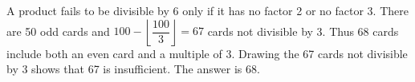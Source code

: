 A product fails to be divisible by 6 only if it has no factor 2 or no factor 3. There are 50 odd cards and $100-\left\lfloor\dfrac{100}{3}\right\rfloor=67$ cards not divisible by 3. Thus 68 cards include both an even card and a multiple of 3. Drawing the 67 cards not divisible by 3 shows that 67 is insufficient. The answer is $\boxed{68}$.
